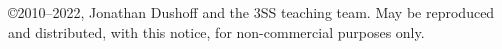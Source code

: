 \copyright 2010--2022, Jonathan Dushoff and the 3SS teaching team.  May be reproduced and distributed, with this notice, for non-commercial purposes only.
